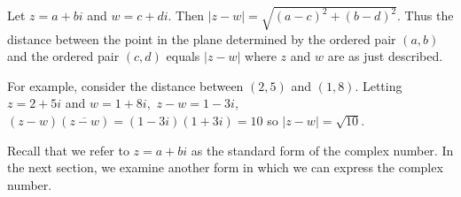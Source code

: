 Let $z=a+bi$ and $w=c+di.$ Then $\left| z-w\right| =\sqrt{\left(
a-c\right) ^{2}+\left( b-d\right) ^{2}}.$ Thus the distance between the
point in the plane determined by the ordered pair $\left( a,b\right) $ and
the ordered pair $\left( c,d\right) $ equals $\left| z-w\right| $ where $z$
and $w$ are as just described.

For example, consider the distance between $\left( 2,5\right) $ and $\left(
1,8\right) .$ Letting $z=2+5i$ and $w=1+8i,$ $z-w=1-3i$, $\left( z-w\right)
\left( \overline{z-w}\right) =\left( 1-3i\right) \left( 1+3i\right)
= 10$ so $\left\vert z-w\right\vert =\sqrt{10}$.

Recall that we refer to $z=a+bi$ as the standard form of the complex number. In the next section, 
we examine another form in which we can express the complex number. 